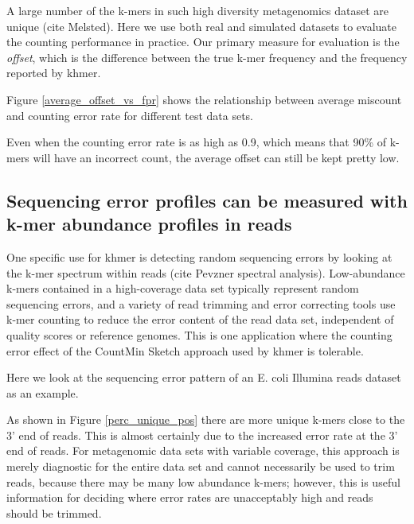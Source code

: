 \documentclass{article}
\begin{document}
A large number of the k-mers in such high diversity metagenomics
dataset are unique (cite Melsted). Here we use both real and simulated
datasets to evaluate the counting performance in practice.  Our
primary measure for evaluation is the {\em offset}, which is the
difference between the true k-mer frequency and the frequency reported
by khmer.

Figure \ref{average_offset_vs_fpr} shows the relationship between average 
miscount and counting error rate for different test data sets.

Even when the counting error rate is as high as 0.9, which means that
90\% of k-mers will have an incorrect count, the average offset can
still be kept pretty low.



\subsection{Sequencing error profiles can be measured with k-mer abundance
profiles in reads}

One specific use for khmer is detecting random sequencing errors by
looking at the k-mer spectrum within reads (cite Pevzner spectral
analysis).  Low-abundance k-mers contained in a high-coverage data set
typically represent random sequencing errors, and a variety of read
trimming and error correcting tools use k-mer counting to reduce the
error content of the read data set, independent of quality scores or
reference genomes.  This is one application where the counting error
effect of the CountMin Sketch approach used by khmer is tolerable.

Here we look at the sequencing error pattern of an E. coli Illumina
reads dataset as an example.  



As shown in Figure \ref{perc_unique_pos} there are more unique k-mers
close to the 3' end of reads.  This is almost certainly due to the
increased error rate at the 3' end of reads. For metagenomic data sets
with variable coverage, this approach is merely diagnostic for the
entire data set and cannot necessarily be used to trim reads, because
there may be many low abundance k-mers; however, this is useful
information for deciding where error rates are unacceptably high and
reads should be trimmed.
\end{document}
